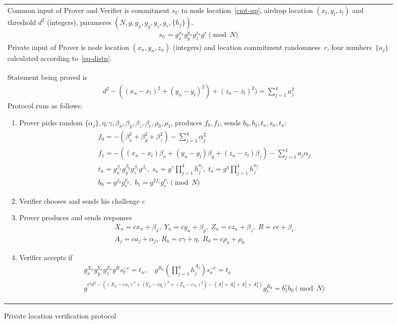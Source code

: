 \documentclass{article}
\begin{document}
\begin{figure}[!htb]
\begin{tabular}{|p{\linewidth}|}
\hline

Common input of Prover and Verifier is
  commitment $s_U$ to node location~\eqref{cmt-up},
  airdrop location $(x_l, y_l, z_l)$ and
  threshold $d^2$ (integers),
  parameres $(N, g, g_x, g_y, g_z, g_r, \{h_j\})$.
\begin{gather}
\label{cmt-up}
  s_U = g_x^{x_n} g_y^{y_n} g_z^{z_n} g^{r} \pmod{N}
\end{gather}
Private input of Prover is
  node location $(x_n, y_n, z_n)$ (integers) and location commitment randomness~$r$,
  four numbers~$\{a_j\}$ calculated
  according to~\eqref{eq-distn}.
\\
Statement being proved is
\begin{gather}
\label{eq-distn}
  d^2 - ((x_n - x_l)^2 + (y_n - y_l)^2) + (z_n - z_l)^2) = \sum_{j=1}^4 a_j^2
\end{gather}
Protocol runs as follows:
\begin{enumerate}
\item
  Prover picks random $\{\alpha_j\}, \eta, \gamma, \beta_x, \beta_y, \beta_z, \beta_r, \rho_0, \rho_1$,
  produces $f_0, f_1$, sends $b_0, b_1, t_a, s_a, t_n$:
\begin{gather}
  f_0 = -(\beta_x^2 + \beta_y^2 + \beta_z^2) - \sum_{j=1}^4 \alpha_j^2   \\
  f_1 = -( (x_n - x_l) \beta_x  + (y_n - y_l) \beta_y  + (z_n - z_l) \beta_z) - \sum_{j=1}^4 a_j \alpha_j   \\
%
  t_n = g_x^{\beta_x} g_y^{\beta_y} g_z^{\beta_z} g^{\beta_r} ,   \;
  s_a = g^{\gamma} \prod_{j=1}^4 h_j^{a_j},   \;
  t_a = g^{\eta} \prod_{j=1}^4 h_j^{\alpha_j} \\
  b_0 = g^{f_0} g_r^{\rho_0},  \;
  b_1 = g^{2 f_1} g_r^{\rho_1} \pmod{N}
\end{gather}
%
\item
  Verifier chooses and sends his challenge $c$
\item
  Prover produces and sends responses
\begin{gather}
  X_n = c x_n + \beta_x,  \;
  Y_n = c y_n + \beta_y,  \;
  Z_n = c z_n + \beta_z,  \;
  R = c r + \beta_r   \\
  A_j = c a_j + \alpha_j, \;
  R_a = c \gamma + \eta,   \;
  R_d = c \rho_1 + \rho_0
\end{gather}
%
\item
  Verifier accepts if
\begin{gather}
\label{verf-linear}
  g_x^{X_n} g_y^{Y_n} g_z^{Z_n} g^{R} s_U^{-c} = t_n, \quad
  g^{R_a} (\prod_{j=1}^4 h_j^{A_j}) s_a^{-c} = t_a \\
\label{verf-distn}
  g^{c^2 d^2 - ((X_n - c x_l)^2 + (Y_n - c y_l)^2 + (Z_n - c z_l)^2) - (A_1^2 + A_2^2 + A_3^2 + A_4^2)} g_r^{R_d} = b_1^{c} b_0  \pmod{N}
\end{gather}
\end{enumerate}
\\
\hline
\end{tabular}
\caption{Private location verification protocol}
\label{ip_fig}
\end{figure}
\end{document}
